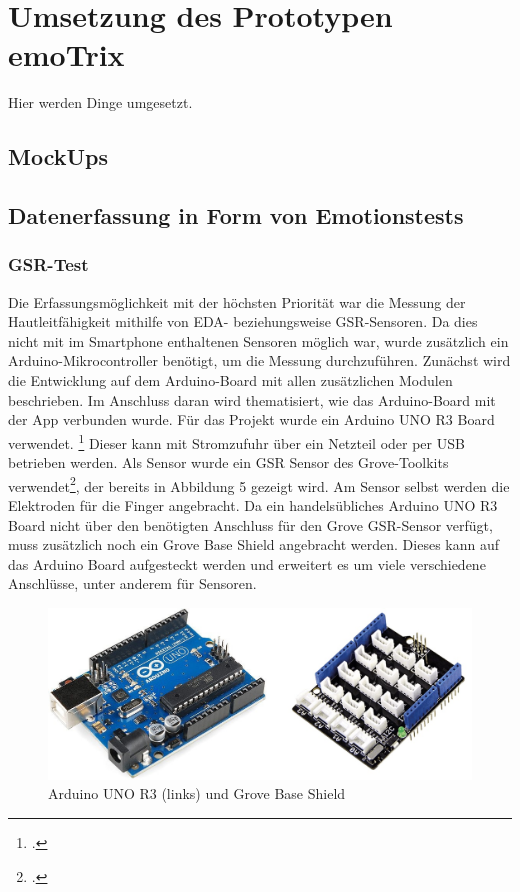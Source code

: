 \section{Umsetzung des Prototypen emoTrix}
Hier werden Dinge umgesetzt.
\subsection{MockUps}
\subsection{Datenerfassung in Form von Emotionstests}
\subsubsection{GSR-Test}
Die Erfassungsmöglichkeit mit der höchsten Priorität war die Messung der Hautleitfähigkeit mithilfe von EDA- beziehungsweise GSR-Sensoren. Da dies nicht mit im Smartphone enthaltenen Sensoren möglich war, wurde zusätzlich ein Arduino-Mikrocontroller benötigt, um die Messung durchzuführen. Zunächst wird die Entwicklung auf dem Arduino-Board mit allen zusätzlichen Modulen beschrieben. Im Anschluss daran wird thematisiert, wie das Arduino-Board mit der App verbunden wurde. \newline
Für das Projekt wurde ein Arduino UNO R3 Board verwendet. \footcite[Vgl.][]{Ard18} Dieser kann mit Stromzufuhr über ein Netzteil oder per USB betrieben werden. Als Sensor wurde ein GSR Sensor des Grove-Toolkits verwendet\footcite[Vgl.][]{Gro18}, der bereits in Abbildung 5 gezeigt wird. Am Sensor selbst werden die Elektroden für die Finger angebracht. Da ein handelsübliches Arduino UNO R3 Board nicht über den benötigten Anschluss für den Grove GSR-Sensor verfügt, muss zusätzlich noch ein Grove Base Shield angebracht werden. Dieses kann auf das Arduino Board aufgesteckt werden und erweitert es um viele verschiedene Anschlüsse, unter anderem für Sensoren.
\begin{figure}[h]
	\centering
	\includegraphics[width=16cm]{Bilder/arduino.jpg}
	\caption[Arduino UNO R3 (links) und Grove Base Shield]{Arduino UNO R3 (links) und Grove Base Shield\footnotemark}
\end{figure}%
